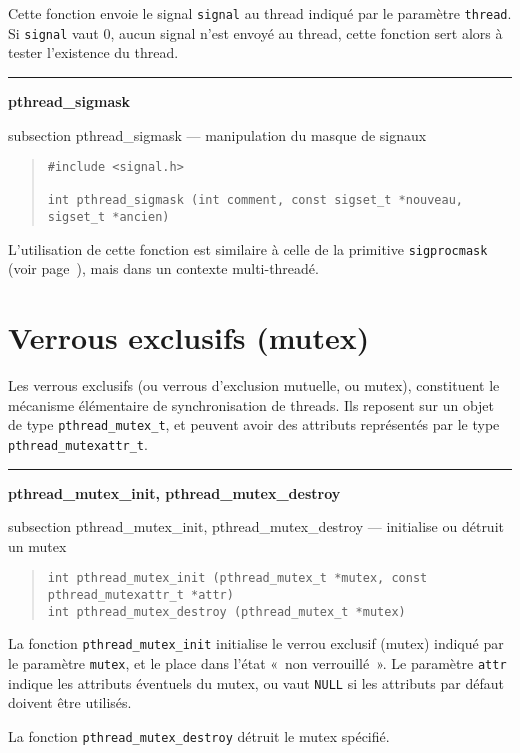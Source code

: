 \documentclass [twoside] {report}
\newcommand {\primitive} [1]
    {
	\phantomsection
	{\large \bf #1}
	\addcontentsline {toc} {subsection} {#1}
    }
\newcommand {\separation}
    {
	\vspace {5mm}
	\nopagebreak
	\hrule
    }
\begin{document}
Cette fonction envoie le signal \texttt {signal} au thread indiqué par le
paramètre \texttt {thread}.  Si \texttt {signal} vaut 0, aucun signal
n'est envoyé au thread, cette fonction sert alors à tester l'existence
du thread.


\separation
\primitive {pthread\_sigmask} --- manipulation du masque de signaux

\begin {quote}
\begin {verbatim}
#include <signal.h>

int pthread_sigmask (int comment, const sigset_t *nouveau, sigset_t *ancien)
\end{verbatim}
\end {quote}

L'utilisation de cette fonction est similaire à celle de la primitive
\texttt {sigprocmask} (voir page~\pageref {sigprocmask}), mais dans un
contexte multi-threadé.


\section {Verrous exclusifs (mutex)}

Les verrous exclusifs (ou verrous d'exclusion mutuelle, ou mutex),
constituent le mécanisme élémentaire de synchronisation de threads. Ils
reposent sur un objet de type \verb|pthread_mutex_t|, et peuvent avoir
des attributs représentés par le type \verb|pthread_mutexattr_t|.

\separation
\primitive {pthread\_mutex\_init, pthread\_mutex\_destroy} --- initialise ou détruit un mutex

\begin {quote}
\begin {verbatim}
int pthread_mutex_init (pthread_mutex_t *mutex, const pthread_mutexattr_t *attr)
int pthread_mutex_destroy (pthread_mutex_t *mutex)
\end{verbatim}
\end {quote}

La fonction \verb|pthread_mutex_init| initialise le verrou exclusif
(mutex) indiqué par le paramètre \texttt {mutex}, et le place dans
l'état «~non verrouillé~». Le paramètre \texttt {attr} indique les
attributs éventuels du mutex, ou vaut \texttt {NULL} si les attributs
par défaut doivent être utilisés.

La fonction \verb|pthread_mutex_destroy| détruit le mutex spécifié.
\end{document}
